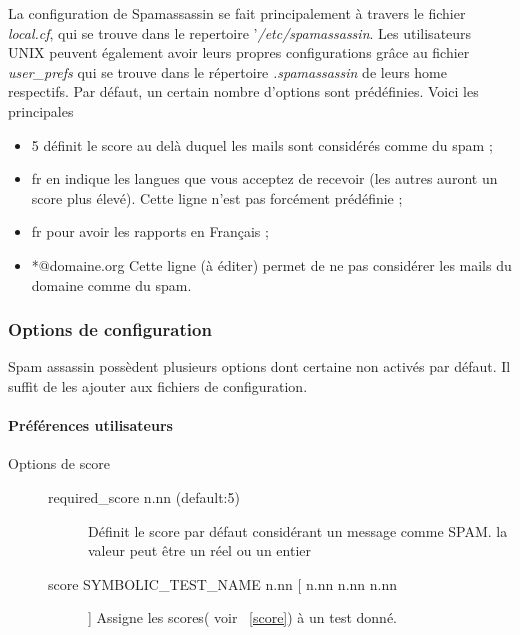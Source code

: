 \documentclass[a4paper,11pt]{article}
\begin{document}
La configuration de Spamassassin se fait principalement à travers le fichier \emph{local.cf}, qui se trouve dans le 
repertoire '\emph{/etc/spamassassin}.
Les utilisateurs UNIX peuvent également avoir leurs propres configurations grâce au fichier \emph{user\_prefs}
qui se trouve dans le répertoire \emph{.spamassassin} de leurs home respectifs. 
Par défaut, un certain nombre d’options sont prédéfinies. Voici les principales \begin{itemize}
 \item 5 définit le score au delà duquel les mails sont considérés comme du spam ;
 \item fr en indique les langues que vous acceptez de recevoir (les autres auront un score plus élevé). Cette ligne n’est pas forcément prédéfinie ;
 \item fr pour avoir les rapports en Français ;
 \item *@domaine.org Cette ligne (à éditer) permet de ne pas considérer les mails du domaine comme du spam.
\end{itemize}

\subsubsection{Options de configuration}

Spam assassin possèdent plusieurs options dont certaine non activés par défaut. Il suffit de les ajouter aux fichiers 
de configuration.

\paragraph{Préférences utilisateurs}

\begin{description}
 \item [Options de score] \begin{description}
                           \item [required\_score n.nn (default:5)] Définit le score par défaut considérant un message comme SPAM. la valeur peut être un réel ou un entier
                           \item [score SYMBOLIC\_TEST\_NAME n.nn [ n.nn n.nn n.nn ]] Assigne les scores( voir ~\ref{score}) à un test donné.
                          \end{description}


\end{description}



\appendix
\end{document}
